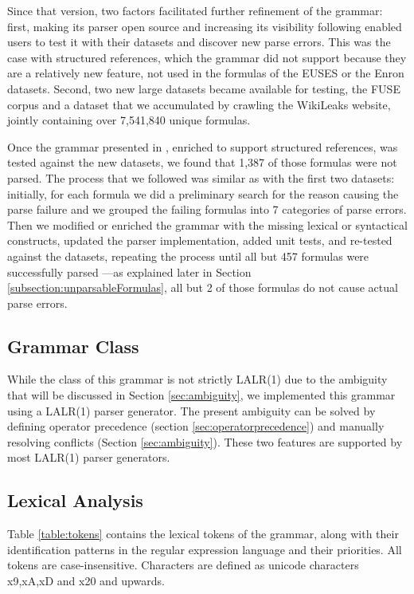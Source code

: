 \documentclass[times]{smrauth}
\begin{document}
Since that version, two factors facilitated further refinement of the grammar: first, making its parser open source and increasing its visibility following \cite{XLparser} enabled users to test it with their datasets and discover new parse errors. This was the case with structured references, which the grammar did not support because they are a relatively new feature, not used in the formulas of the EUSES or the Enron datasets. Second, two new large datasets became available for testing, the FUSE corpus \cite{fuse} and a dataset that we accumulated by crawling the WikiLeaks website, jointly containing over 7,541,840 unique formulas.

Once the grammar presented in \cite{XLparser}, enriched to support structured references, was tested against the new datasets, we found that 1,387 of those formulas were not parsed. The process that we followed was similar as with the first two datasets: initially, for each formula we did a preliminary search for the reason causing the parse failure and we grouped the failing formulas into 7 categories of parse errors. Then we modified or enriched the grammar with the missing lexical or syntactical constructs, updated the parser implementation, added unit tests, and re-tested against the datasets, repeating the process until all but 457 formulas were successfully parsed ---as explained later in Section \ref{subsection:unparsableFormulas}, all but 2 of those formulas do not cause actual parse errors.

\subsection{Grammar Class}
\label{sec:grammarclass}
While the class of this grammar is not strictly LALR(1) due to the ambiguity that will be discussed in Section \ref{sec:ambiguity}, we implemented this grammar using a LALR(1) parser generator.
The present ambiguity can be solved by defining operator precedence (section \ref{sec:operatorprecedence}) and manually resolving conflicts (Section \ref{sec:ambiguity}).
These two features are supported by most LALR(1) parser generators.

\subsection{Lexical Analysis}
Table \ref{table:tokens} contains the lexical tokens of the grammar, along with their identification patterns in the regular expression language and their priorities. All tokens are case-insensitive.
Characters are defined as unicode characters x9,xA,xD and x20 and upwards.
\end{document}
